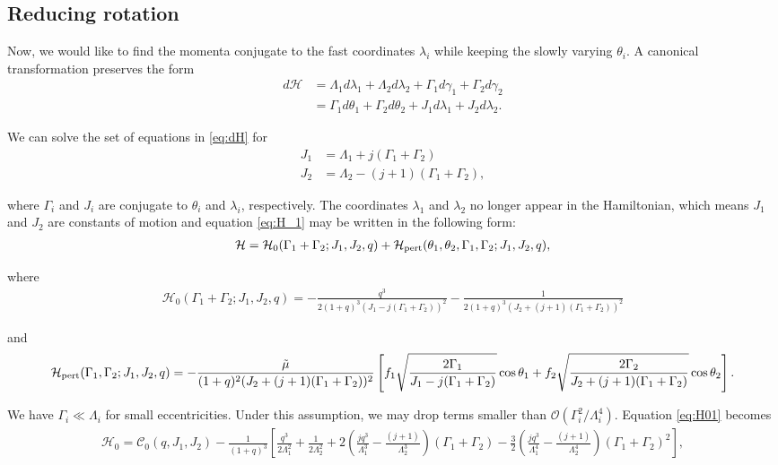 \documentclass[usenatbib,twocolumn]{mnras}
\begin{document}
\subsection{Reducing rotation}
\label{sec:orge5eb869}
Now, we would like to find the momenta conjugate to the fast
coordinates \(\lambda_i\) while keeping the slowly varying \(\theta_i\).
A canonical transformation preserves the form
\begin{align}
  \label{eq:dH} 
  d\mathcal{H}
  &= \Lambda_1 d\lambda_1+\Lambda_2d\lambda_2
    + \Gamma_1d\gamma_1+\Gamma_2d\gamma_2\nonumber\\
  &= \Gamma_1 d\theta_1 + \Gamma_2 d\theta_2
    +J_1 d\lambda_1+J_2d\lambda_2 .
\end{align}

\noindent
We can solve the set of equations in \eqref{eq:dH} for
\begin{align}
\label{eq:J1}
J_1 &= \Lambda_1 + j(\Gamma_1+\Gamma_2)\\
\label{eq:J2}
J_2 &= \Lambda_2 - (j+1)(\Gamma_1+\Gamma_2),
\end{align}

\noindent where \(\Gamma_i\) and \(J_i\) are conjugate to
\(\theta_i\) and \(\lambda_i\), respectively.
The coordinates \(\lambda_1\) and \(\lambda_2\)
no longer appear in the Hamiltonian,
which means \(J_1\) and \(J_2\) are constants of motion and
equation \eqref{eq:H_1} may be written
in the following form:
\begin{align}
\label{eq:H_2}
  \mathcal{H}
  = \mathcal{H}_0(\Gamma_1+\Gamma_2; J_1, J_2, q)
                  + \mathcal{H}_{\rm pert}(\theta_1, \theta_2, \Gamma_1,\Gamma_2; J_1, J_2, q),
\end{align}

\noindent
where
\begin{align}
  \label{eq:H01}
  \mathcal{H}_0(\Gamma_1+\Gamma_2; J_1, J_2, q)
  = -\frac{q^3}{2(1+q)^3(J_1-j(\Gamma_1+\Gamma_2))^2}
  -\frac{1}{2(1+q)^3(J_2+(j+1)(\Gamma_1+\Gamma_2))^2} 
\end{align}

\noindent
and
\begin{align}
  \label{eq:Hpert1}
  \mathcal{H}_{\rm pert}(\Gamma_1,\Gamma_2; J_1, J_2, q)
  = -\frac{\tilde\mu}{(1+q)^2(J_2+(j+1)(\Gamma_1+\Gamma_2))^2}
  \left[
    f_1\sqrt{\frac{2\Gamma_1}{J_1 - j(\Gamma_1+\Gamma_2)}}\cos\theta_1
  +f_2\sqrt{\frac{2\Gamma_2}{J_2 + (j+1)(\Gamma_1+\Gamma_2)}}\cos\theta_2
    \right].
\end{align}

\noindent We have \(\Gamma_i \ll \Lambda_i\) for small
eccentricities.  Under this assumption, we may drop terms smaller than
\(\mathcal{O}(\Gamma_i^2/\Lambda_i^4)\).  Equation \eqref{eq:H01} becomes
\begin{align}
  \label{eq:H02}
  \mathcal{H}_0
  = \mathcal C_0(q, J_1, J_2) -\frac{1}{(1+q)^3}\left[
     \frac{q^3}{2\Lambda_1^2} + \frac{1}{2\Lambda_2^2}
   + 2\left(
     \frac{jq^3}{\Lambda_1^3} - \frac{(j+1)}{\Lambda_2^3}
     \right)(\Gamma_1+\Gamma_2)
   -\frac32\left( 
     \frac{jq^3}{\Lambda_1^4} - \frac{(j+1)}{\Lambda_2^4}\right)
     (\Gamma_1+\Gamma_2)^2
     \right],
\end{align}
\end{document}
